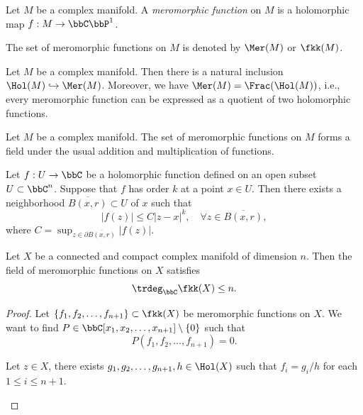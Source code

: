 \begin{definition}\label{def:meromorphic_functions}
	Let \(M\) be a complex manifold.
	A \emph{meromorphic function} on \(M\) is a holomorphic map \(f: M \to \bbC\bbP^1\).

	The set of meromorphic functions on \(M\) is denoted by \(\Mer(M)\) or \(\fkk(M)\).
\end{definition}

\begin{proposition}\label{prop:meromorphic_functions_and_holomorphic_functions}
	Let \(M\) be a complex manifold.
	Then there is a natural inclusion \(\Hol(M) \hookrightarrow \Mer(M)\).
	Moreover, we have \(\Mer(M) = \Frac(\Hol(M))\), i.e., every meromorphic function can be expressed as a quotient of two holomorphic functions.
\end{proposition}

\begin{proposition}\label{prop:meromorphic_functions_is_a_field}
	Let \(M\) be a complex manifold.
	The set of meromorphic functions on \(M\) forms a field under the usual addition and multiplication of functions.
\end{proposition}




\begin{proposition}\label{prop:schwarz_lemma_in_several_variables}
	Let \(f:U \to \bbC\) be a holomorphic function defined on an open subset \(U \subset \bbC^n\).
	Suppose that \(f\) has order \(k\) at a point \(x \in U\).
	Then there exists a neighborhood \(\overline{B(x,r)} \subset U\) of \(x\) such that
	\[
		|f(z)| \leq C |z - x|^k, \quad \forall z \in \overline{B(x,r)},
	\]
	where \(C = \sup_{z \in \partial \overline{B(x,r)}} \left| f(z) \right|\).
\end{proposition}

\begin{theorem}\label{thm:Siegel_theorem_on_function_fields_of_complex_manifolds}
	Let \(X\) be a connected and compact complex manifold of dimension \(n\).
	Then the field of meromorphic functions on \(X\) satisfies
	\[
		\trdeg_{\bbC} \fkk(X) \leq n.
	\]
\end{theorem}
\begin{proof}
	Let \(\{f_1, f_2, \ldots, f_{n+1}\} \subset \fkk(X)\) be meromorphic functions on \(X\).
	We want to find \(P \in \bbC[x_1, x_2, \ldots, x_{n+1}] \setminus \{0\}\) such that
	\[ P(f_1, f_2, \ldots, f_{n+1}) = 0. \]

	\begin{step}
		Let \(z \in X\), there exists \(g_1, g_2, \ldots, g_{n+1}, h \in \Hol(X)\) such that \(f_i = g_i / h\) for each \(1 \leq i \leq n+1\).
	\end{step}

\end{proof}


